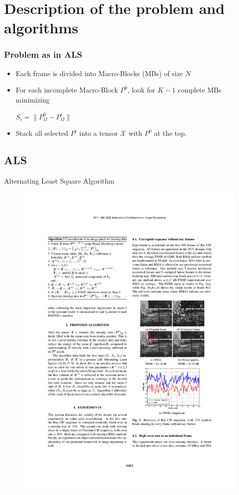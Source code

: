 \documentclass{beamer}
\begin{document}
\begin{frame}[fragile]
\end{frame}

\section{Description of the problem and algorithms} 
\begin{frame}
\frametitle{Problem as in ALS}
\begin{itemize}
\item Each frame is divided into Macro-Blocks (MBs) of size $N$ 
\item For each incomplete Macro-Block $P^0$, look for $K-1$ complete MBs minimizing\\
\begin{center} $S_i=\| P^0_{\Omega}-P^i_{\Omega}\|$ \end{center}
\item Stack all selected $P^i$ into a tensor $\mathcal{X}$ with $P^0$ at the top.
\end{itemize}


\end{frame}

\subsection{ALS}

\begin{frame}[fragile] %
\begin{block}{Alternating Least Square Algorithm}
\begin{figure}
\includegraphics[width=0.7\linewidth]{AlgoALS}
\end{figure}
\end{block}
\end{frame}
\end{document}

